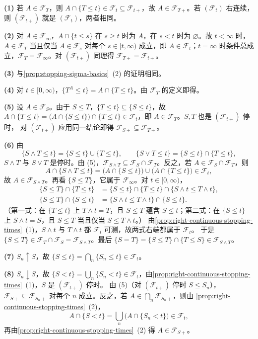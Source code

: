 \documentclass[UTF8,11pt,a4paper,oneside,fontset=fandol]{ctexrep}
\makeatletter
\numberwithin{equation}{section}
\theoremstyle{zhthm}
\renewenvironment{proof}[1][\proofname]{\par
  \pushQED{\qed}%
  \normalfont\topsep6\p@\@plus6\p@\relax
  \trivlist
  \item[\hskip\labelsep\bfseries#1\hspace{0.5em}]\ignorespaces
}{%
  \popQED\endtrivlist\@endpefalse
}
\renewcommand{\proofname}{证明}
\newcommand{\F}{\mathcal{F}}
\makeatother
\begin{document}
\begin{proof}
\textbf{(1)} 若 $A\in\F_T$，则 $A\cap\{T\le t\}\in\F_t\subseteq\F_{t+}$，故 $A\in\F_{T+}$。若 $(\F_t)$ 右连续，则 $(\F_{t+})$ 就是 $(\F_t)$，两者相同。

\textbf{(2)} 对 $A\in\F_\infty$，$A\cap\{t\le s\}$ 在 $s\ge t$ 时为 $A$，在 $s<t$ 时为 $\varnothing$。故 $t<\infty$ 时，$A\in\F_T$ 当且仅当
$A\in\F_s$ 对每个 $s\in[t,\infty)$ 成立，即 $A\in\F_t$；$t=\infty$ 时条件总成立，$\F_T=\F_\infty$。对 $(\F_{t+})$ 同理得 $\F_{T+}=\F_{t+}$。

\textbf{(3)} 与\cref{prop:stopping-sigma-basics}~(2) 的证明相同。

\textbf{(4)} 对 $t\in[0,\infty)$，$\{T^A\le t\}=A\cap\{T\le t\}$。由 $\F_T$ 的定义即得。

\textbf{(5)} 设 $A\in\F_S$。由于 $S\le T$，$\{T\le t\}\subseteq\{S\le t\}$，故
$A\cap\{T\le t\}=\bigl(A\cap\{S\le t\}\bigr)\cap\{T\le t\}\in\F_t$，即 $A\in\F_T$。$S,T$ 也是 $(\F_{t+})$ 停时，
对 $(\F_{t+})$ 应用同一结论即得 $\F_{S+}\subseteq\F_{T+}$。

\textbf{(6)} 由
\[
  \{S\wedge T\le t\}=\{S\le t\}\cup\{T\le t\},\qquad \{S\vee T\le t\}=\{S\le t\}\cap\{T\le t\},
\]
$S\wedge T$ 与 $S\vee T$ 是停时。由 (5)，$\F_{S\wedge T}\subseteq\F_S\cap\F_T$。反之，若 $A\in\F_S\cap\F_T$，则
\[
  A\cap\{S\wedge T\le t\}=\bigl(A\cap\{S\le t\}\bigr)\cup\bigl(A\cap\{T\le t\}\bigr)\in\F_t,
\]
故 $A\in\F_{S\wedge T}$。再看 $\{S\le T\}$，它属于 $\F_\infty$。对 $t\in[0,\infty)$，
\begin{align*}
  \{S\le T\}\cap\{T\le t\}&=\{S\le t\}\cap\{T\le t\}\cap\{S\wedge t\le T\wedge t\},\\
  \{S\le T\}\cap\{S\le t\}&=\{S\wedge t\le T\wedge t\}\cap\{S\le t\}.
\end{align*}
（第一式：在 $\{T\le t\}$ 上 $T\wedge t=T$，且 $S\le T$ 蕴含 $S\le t$；第二式：在 $\{S\le t\}$ 上 $S\wedge t=S$，且 $S\le T$ 当且仅当 $S\le T\wedge t$。）
由\cref{prop:right-continuous-stopping-times}~(1)，$S\wedge t$ 与 $T\wedge t$ 都 $\F_t$ 可测，故两式右端都属于 $\F_t$。
于是 $\{S\le T\}\in\F_T\cap\F_S=\F_{S\wedge T}$。最后 $\{S=T\}=\{S\le T\}\cap\{T\le S\}\in\F_{S\wedge T}$。

\textbf{(7)} $S_n\uparrow S$，故 $\{S\le t\}=\bigcap_n\{S_n\le t\}\in\F_t$。

\textbf{(8)} $S_n\downarrow S$，故 $\{S<t\}=\bigcup_n\{S_n<t\}\in\F_t$，由\cref{prop:right-continuous-stopping-times}~(1)，$S$ 是 $(\F_{t+})$ 停时。
由 (5)（对 $(\F_{t+})$ 停时 $S\le S_n$），$\F_{S+}\subseteq\F_{S_n+}$ 对每个 $n$ 成立。反之，若 $A\in\bigcap_n\F_{S_n+}$，则由
\cref{prop:right-continuous-stopping-times}~(2)，
\[
  A\cap\{S<t\}=\bigcup_n\bigl(A\cap\{S_n<t\}\bigr)\in\F_t,
\]
再由\cref{prop:right-continuous-stopping-times}~(2) 得 $A\in\F_{S+}$。


\end{proof}
\end{document}
